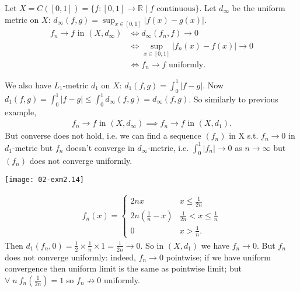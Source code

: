 \begin{example}
    Let $X = C([0, 1]) = \{f:[0, 1] \to \mathbb{R} \mid f \text{ continuous}\}$.
    Let $d_\infty$ be the uniform metric on $X$: $d_\infty(f, g) = \sup_{x \in [0, 1]} |f(x) - g(x)|$.
    \begin{align*}
        f_n \to f \text{ in } (X, d_\infty) &\iff d_\infty(f_n, f) \to 0 \\
        &\iff \sup_{x \in [0, 1]} |f_n(x) - f(x)| \to 0 \\
        &\iff f_n \to f \text{ uniformly.}
    \end{align*} 

    We also have $L_1$-metric $d_1$ on $X$: $d_1(f, g) = \int_0^1 |f - g|$.
    Now $d_1(f, g) = \int_0^1 |f-g| \leq \int_0^1 d_\infty(f, g) = d_\infty(f, g)$.
    So similarly to previous example,
    \begin{align*}
        f_n \to f \text{ in } (X, d_\infty) \implies f_n \to f \text{ in } (X, d_1).
    \end{align*} 
    But converse does not hold, i.e. we can find a sequence $(f_n)$ in X s.t. $f_n \to 0$ in $d_1$-metric but $f_n$ doesn't converge in $d_\infty$-metric, i.e. $\int_0^1 |f_n| \to 0$ as $n \to \infty$ but $(f_n)$ does not converge uniformly.
    {\par
    \centering 
    \texttt{[image: 02-exm2.14]} 
    \par}
    \begin{align*}
        f_n(x) = \begin{cases}
            2nx & x \leq \frac{1}{2n} \\
            2n (\frac{1}{n} - x) & \frac{1}{2n} < x \leq \frac{1}{n} \\
            0 & x > \frac{1}{n}.
        \end{cases} 
    \end{align*}
    Then $d_1(f_n, 0) = \frac{1}{2} \times \frac{1}{n} \times 1 = \frac{1}{2n} \to 0$.
    So in $(X, d_1)$ we have $f_n \to 0$.
    But $f_n$ does not converge uniformly: indeed, $f_n \to 0$ pointwise; if we have uniform convergence then uniform limit is the same as pointwise limit; but $\forall \; n \ f_n(\frac{1}{2n}) = 1$ so $f_n \not\to 0$ uniformly.
\end{example} 

